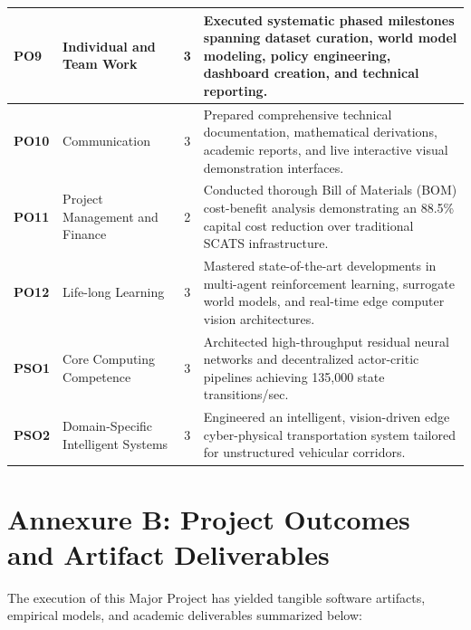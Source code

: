 \documentclass[12pt,a4paper,oneside]{report}
\begin{document}
\begin{small}
\begin{longtable}{|p{1.8cm}|p{2.8cm}|c|p{8.2cm}|}
\textbf{PO9} & Individual and Team Work & 3 & Executed systematic phased milestones spanning dataset curation, world model modeling, policy engineering, dashboard creation, and technical reporting. \\ \hline
\textbf{PO10} & Communication & 3 & Prepared comprehensive technical documentation, mathematical derivations, academic reports, and live interactive visual demonstration interfaces. \\ \hline
\textbf{PO11} & Project Management and Finance & 2 & Conducted thorough Bill of Materials (BOM) cost-benefit analysis demonstrating an 88.5\% capital cost reduction over traditional SCATS infrastructure. \\ \hline
\textbf{PO12} & Life-long Learning & 3 & Mastered state-of-the-art developments in multi-agent reinforcement learning, surrogate world models, and real-time edge computer vision architectures. \\ \hline
\textbf{PSO1} & Core Computing Competence & 3 & Architected high-throughput residual neural networks and decentralized actor-critic pipelines achieving 135,000 state transitions/sec. \\ \hline
\textbf{PSO2} & Domain-Specific Intelligent Systems & 3 & Engineered an intelligent, vision-driven edge cyber-physical transportation system tailored for unstructured vehicular corridors. \\
\end{longtable}
\end{small}

\chapter*{Annexure B: Project Outcomes and Artifact Deliverables}
\label{annex:outcomes}

The execution of this Major Project has yielded tangible software artifacts, empirical models, and academic deliverables summarized below:
\end{document}
